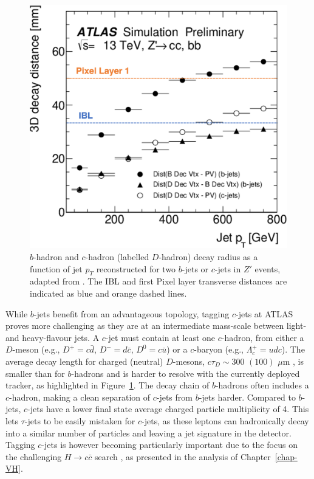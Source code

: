 \begin{figure}[h!]
\begin{minipage}{0.48\textwidth}
  \includegraphics[width=\textwidth]{Images/FTAG/intro/bhaddecay2ada.png}
  \caption{$b$-hadron and $c$-hadron (labelled $D$-hadron) decay radius as a function of jet $p_T$ reconstructed for two $b$-jets or $c$-jets in $Z'$ events, adapted from \cite{ATL-PHYS-PUB-2018-025}. The IBL and first Pixel layer transverse distances are indicated as blue and orange dashed lines.} 
  \label{fig:bhaddecay}
\end{minipage}
\end{figure}

While $b$-jets benefit from an advantageous topology, tagging $c$-jets at ATLAS proves more challenging as they are at an intermediate mass-scale between light- and heavy-flavour jets. A $c$-jet must contain at least one $c$-hadron, from either a $D$-meson (e.g., $D^+=c\bar{d}$, $D^-=d\bar{c}$, $D^0=c\bar{u}$) or a $c$-baryon (e.g., $\Lambda_c^+=udc$). The average decay length for charged (neutral) $D$-mesons, $c\tau_D \sim 300$ $(100)$ $\mu$m \cite{Tanabashi:2018oca}, is smaller than for $b$-hadrons and is harder to resolve with the currently deployed tracker, as highlighted in Figure~\ref{fig:bhaddecay}. The decay chain of $b$-hadrons often includes a $c$-hadron, making a clean separation of $c$-jets from $b$-jets harder. Compared to $b$-jets, $c$-jets have a lower final state average charged particle multiplicity of 4. This lets $\tau$-jets to be easily mistaken for $c$-jets, as these leptons can hadronically decay into a similar number of particles and leaving a jet signature in the detector. Tagging $c$-jets is however becoming particularly important due to the focus on the challenging $H \rightarrow c\bar{c}$ search \cite{Aaboud:2018fhh, Collaboration:2721696, arXiv:2205.05550}, as presented in the analysis of Chapter~\ref{chap-VH}. 

